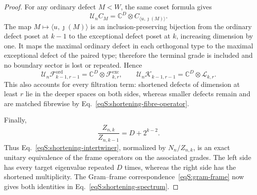 \documentclass[journal,twocolumn]{IEEEtran}
\theoremstyle{definition}
\theoremstyle{plain}
\newcommand{\Ord}{\mathrm{ord}}
\newcommand{\Exc}{\mathrm{exc}}
\begin{document}
\begin{proof}
For any ordinary defect $M<W$, the same coset formula gives
\begin{equation}
 \mathcal U_n C_M
 =\mathbb C^D\otimes C_{\langle u,\jmath(M)\rangle}.
 \label{eqS:code-shortening}
\end{equation}
The map $M\mapsto\langle u,\jmath(M)\rangle$ is an
inclusion-preserving bijection from the ordinary defect poset at $k-1$ to
the exceptional defect poset at $k$, increasing dimension by one.  It maps
the maximal ordinary defect in each orthogonal type to the maximal
exceptional defect of the paired type; therefore the terminal grade is
included and no boundary sector is lost or repeated.  Hence
\begin{equation}
 \mathcal U_n\mathcal F^{\Ord}_{k-1,r-1}
 =\mathbb C^D\otimes\mathcal F^{\Exc}_{k,r},\qquad
 \mathcal U_n\mathcal K_{k-1,r-1}
 =\mathbb C^D\otimes\mathcal L_{k,r}.
 \label{eqS:shortening-filtrations}
\end{equation}
This also accounts for every filtration term: shortened defects of
dimension at least $r$ lie in the deeper spaces on both sides, whereas
smaller defects remain and are matched fibrewise by
Eq.~\eqref{eqS:shortening-fibre-operator}.

Finally,
\begin{equation}
 \frac{Z_{n,k}}{Z_{n,k-1}}=D+2^{k-2}.
 \label{eqS:Z-shortening}
\end{equation}
Thus Eq.~\eqref{eqS:shortening-intertwiner}, normalized by $N_n/Z_{n,k}$,
is an exact unitary equivalence of the frame operators on the associated
grades.  The left side has every target eigenvalue repeated $D$ times,
whereas the right side has the shortened multiplicity.  The Gram--frame
correspondence~\eqref{eqS:gram-frame} now gives both identities in
Eq.~\eqref{eqS:shortening-spectrum}.
\end{proof}
\end{document}
